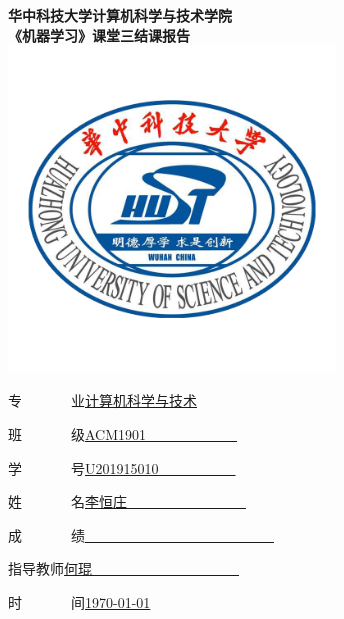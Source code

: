 \begin{titlepage}

\begin{center}


 

{\huge \bfseries 华中科技大学计算机科学与技术学院}\\[1.5cm]

{ \huge \bfseries 《机器学习》课堂三结课报告}\\[1.5cm]

\includegraphics[width=0.65\textwidth]{figure/logo1.png}\\[1.5cm]   






\begin{minipage}{0.5\textwidth}
\large
{\heiti 专~~~~~~~业}\quad \underline{计算机科学与技术}

{\heiti 班~~~~~~~级}\quad \underline{ACM1901~~~~~~~~~~~~~}

{\heiti 学~~~~~~~号}\quad \underline{U201915010~~~~~~~~~~~}

{\heiti 姓~~~~~~~名}\quad \underline{李恒庄~~~~~~~~~~~~~~~~~}

{\heiti 成~~~~~~~绩}\quad \underline{~~~~~~~~~~~~~~~~~~~~~~~~~~~}

{\heiti 指导教师}\quad \underline{何琨~~~~~~~~~~~~~~~~~~~~~}

{\heiti 时~~~~~~~间}\quad \underline{\today}
\end{minipage}

\vfill

\end{center}

\end{titlepage}
